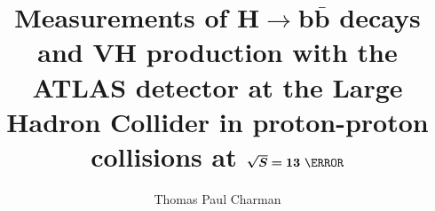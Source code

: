 \documentclass[a4paper,12pt, oneside]{memoir}
\begin{document}
\title{Measurements of $\bm{H\!\to\!b\bar{b}}$ decays and $\bm{V\!H}$ production
  with the ATLAS detector at the Large Hadron Collider in proton-proton
  collisions at $\bm{\sqrt{S}=13}~\TeV$}

\author{Thomas Paul Charman}
\submitdate{\today}

\doublespacing
\maketitle



\clearpage
\newpage


\setcounter{tocdepth}{1}
\tableofcontents
\clearpage
\newpage
\listoffigures
\clearpage
\newpage
\listoftables














\clearpage
\appendix
\begin{appendices}
%
%





%
%
\end{appendices}
\end{document}
